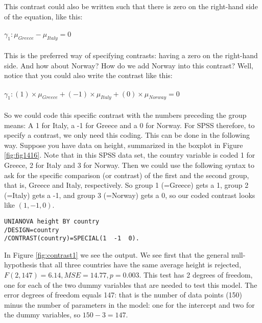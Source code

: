 This contrast could also be written such that there is zero on the right-hand side of the equation, like this:
\\
\\
$\gamma_1: \mu_{Greece}-\mu_{Italy}=0$
\\
\\
This is the preferred way of specifying contrasts: having a zero on the right-hand side. And how about Norway? How do we add Norway into this contrast? Well, notice that you could also write the contrast like this:
\\
\\
$\gamma_1: (1)\times \mu_{Greece} + (-1) \times \mu_{Italy} + (0) \times \mu_{Norway} =0$
\\
\\
So we could code this specific contrast with the numbers preceding the group means: A 1 for Italy, a -1 for Greece and a 0 for Norway. For SPSS therefore, to specify a contrast, we only need this coding. This can be done in the following way. Suppose you have data on height, summarized in the boxplot in Figure \ref{fig:fig1416}. Note that in this SPSS data set, the country variable is coded 1 for Greece, 2 for Italy and 3 for Norway. Then we could use the following syntax to ask for the specific comparison (or contrast) of the first and the second group, that is, Greece and Italy, respectively. So group 1 (=Greece) gets a 1, group 2 (=Italy) gets a -1, and group 3 (=Norway) gets a 0, so our coded contrast looks like $(1, -1, 0)$.



\begin{knitrout}
\color{fgcolor}\begin{kframe}


{\ttfamily\noindent\bfseries{}}\end{kframe}
\end{knitrout}


\begin{verbatim}
UNIANOVA height BY country
/DESIGN=country
/CONTRAST(country)=SPECIAL(1  -1  0).
\end{verbatim}

In Figure \ref{fig:contrast1} we see the output. We see first that the general null-hypothesis that all three countries have the same average height is rejected, $F(2, 147)= 6.14, MSE=14.77, p = 0.003$. This test has 2 degrees of freedom, one for each of the two dummy variables that are needed to test this model. The error degrees of freedom equals 147: that is the number of data points (150) minus the number of parameters in the model: one for the intercept and two for the dummy variables, so $150-3=147$.


